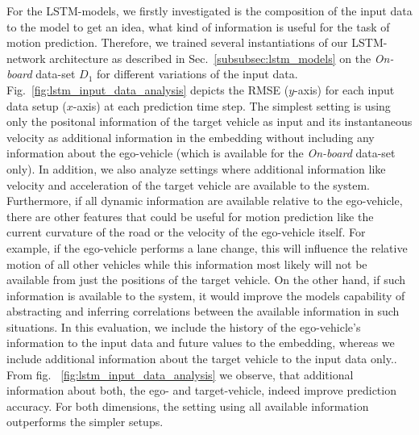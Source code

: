For the \ac{LSTM}-models, we firstly investigated is the composition of the input data to the model to get an idea, what kind of information is useful for the task of motion prediction.
Therefore, we trained several instantiations of our \ac{LSTM}-network architecture as described in Sec.~\ref{subsubsec:lstm_models} on the \emph{On-board} data-set $D_1$ for different variations of the input data.
Fig.~\ref{fig:lstm_input_data_analysis} depicts the \ac{RMSE} ($y$-axis) for each input data setup ($x$-axis) at each prediction time step.
The simplest setting is using only the positonal information of the target vehicle as input and its instantaneous velocity as additional information in the embedding without including any information about the ego-vehicle (which is available for the \emph{On-board} data-set only).
In addition, we also analyze settings where additional information like velocity and acceleration of the target vehicle are available to the system.
Furthermore, if all dynamic information are available relative to the ego-vehicle, there are other features that could be useful for motion prediction like the current curvature of the road or the velocity of the ego-vehicle itself.
For example, if the ego-vehicle performs a lane change, this will influence the relative motion of all other vehicles while this information most likely will not be available from just the positions of the target vehicle. 
On the other hand, if such information is available to the system, it would improve the models capability of abstracting and inferring correlations between the available information in such situations.
In this evaluation, we include the history of the ego-vehicle's information to the input data and future values to the embedding, whereas we include additional information about the target vehicle to the input data only.. 
From fig. ~\ref{fig:lstm_input_data_analysis} we observe, that additional information about both, the ego- and target-vehicle, indeed improve prediction accuracy.
For both dimensions, the setting using all available information outperforms the simpler setups.
